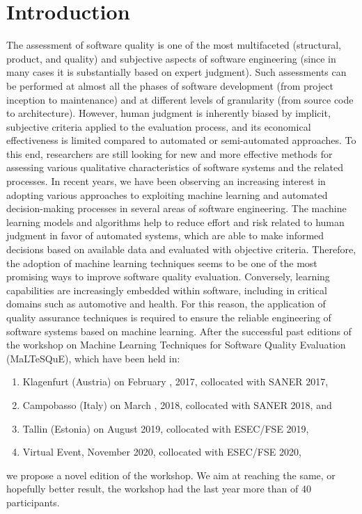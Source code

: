 
\section{Introduction}
\label{sec:motivation}

The assessment of software quality is one of the most multifaceted (\eg structural, product, and quality) and subjective aspects of software engineering (since in many cases it is substantially based on expert judgment).
Such assessments can be performed at almost all the phases of software development (from project inception to maintenance) and at different levels of granularity (from source code to architecture).
However, human judgment is inherently biased by implicit, subjective criteria applied to the evaluation process, and its economical effectiveness is limited compared to automated or semi-automated approaches.
To this end, researchers are still looking for new and more effective methods for assessing various qualitative characteristics of software systems and the related processes.
In recent years, we have been observing an increasing interest in adopting various approaches to exploiting machine learning and automated decision-making processes in several areas of software engineering.
The machine learning models and algorithms help to reduce effort and risk related to human judgment in favor of automated systems, which are able to make informed decisions based on available data and evaluated with objective criteria.
Therefore, the adoption of machine learning techniques seems to be one of the most promising ways to improve software quality evaluation.
Conversely, learning capabilities are increasingly embedded within software, including in critical domains such as automotive and health.
For this reason, the application of quality assurance techniques is required to ensure the reliable engineering of software systems based on machine learning.
After the successful past editions of the workshop on Machine Learning Techniques for Software Quality Evaluation (MaLTeSQuE), which have been held in:
\begin{enumerate}
    \item Klagenfurt (Austria) on February , 2017, collocated with SANER 2017,
    \item Campobasso (Italy) on March  , 2018, collocated with SANER 2018, and
    \item Tallin (Estonia) on August  2019, collocated with ESEC/FSE 2019,
    \item Virtual Event, November   2020, collocated with ESEC/FSE 2020,
\end{enumerate}
we propose a novel edition of the workshop.
We aim at reaching the same, or hopefully better result, the workshop had the last year more than of 40 participants.
